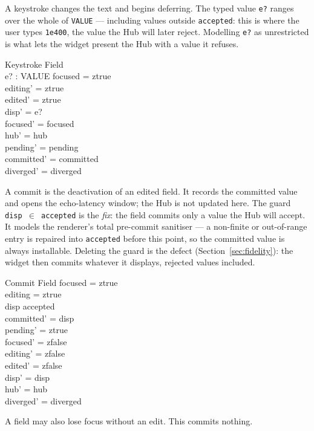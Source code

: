 \documentclass[a4paper,10pt,fleqn]{article}
\begin{document}
A keystroke changes the text and begins deferring.  The typed value \texttt{e?}
ranges over the whole of \texttt{VALUE} --- including values outside
\texttt{accepted}: this is where the user types \texttt{1e400}, the value the Hub
will later reject.  Modelling \texttt{e?} as unrestricted is what lets the widget
present the Hub with a value it refuses.

\begin{schema}{Keystroke}
  \Delta Field \\
  e? : VALUE
\where
  focused = ztrue \\
  editing' = ztrue \\
  edited' = ztrue \\
  disp' = e? \\
  focused' = focused \\
  hub' = hub \\
  pending' = pending \\
  committed' = committed \\
  diverged' = diverged
\end{schema}

A commit is the deactivation of an edited field.  It records the committed value
and opens the echo-latency window; the Hub is not updated here.  The guard
\texttt{disp $\in$ accepted} is the \emph{fix}: the field commits only a value the
Hub will accept.  It models the renderer's total pre-commit sanitiser --- a
non-finite or out-of-range entry is repaired into \texttt{accepted} before this
point, so the committed value is always installable.  Deleting the guard is the
defect (Section~\ref{sec:fidelity}): the widget then commits whatever it displays,
rejected values included.

\begin{schema}{Commit}
  \Delta Field
\where
  focused = ztrue \\
  editing = ztrue \\
  disp \in accepted \\
  committed' = disp \\
  pending' = ztrue \\
  focused' = zfalse \\
  editing' = zfalse \\
  edited' = zfalse \\
  disp' = disp \\
  hub' = hub \\
  diverged' = diverged
\end{schema}

A field may also lose focus without an edit.  This commits nothing.
\end{document}
